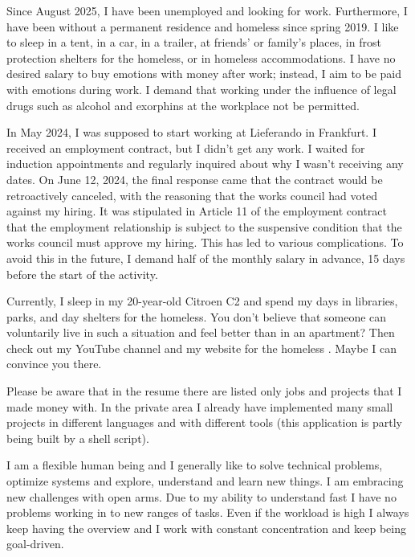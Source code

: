 \versionLanguageStart%
		Since August 2025, I have been unemployed and looking for work.
		Furthermore, I have been without a permanent residence and homeless since spring 2019.
		I like to sleep in a tent, in a car, in a trailer, at friends' or family's places, in frost protection shelters for the homeless, or in homeless accommodations.
		I have no desired salary to buy emotions with money after work; instead, I aim to be paid with emotions during work.
		I demand that working under the influence of legal drugs such as alcohol and exorphins at the workplace not be permitted.

		In May 2024, I was supposed to start working at Lieferando in Frankfurt.
		I received an employment contract, but I didn't get any work.
		I waited for induction appointments and regularly inquired about why I wasn't receiving any dates.
		On June 12, 2024, the final response came that the contract would be retroactively canceled, with the reasoning that the works council had voted against my hiring.
		It was stipulated in Article 11 of the employment contract that the employment relationship is subject to the suspensive condition that the works council must approve my hiring.
		This has led to various complications.
		To avoid this in the future, I demand half of the monthly salary in advance, 15 days before the start of the activity.

        Currently, I sleep in my 20-year-old Citroen C2 and spend my days in libraries, parks, and day shelters for the homeless.
		You don't believe that someone can voluntarily live in such a situation and feel better than in an apartment?
		Then check out my YouTube channel  and my website for the homeless .
		Maybe I can convince you there.

        Please be aware that in the resume there are listed only jobs and projects that I made money with.
		In the private area I already have implemented many small projects in different languages and with different tools (this application is partly being built by a shell script).

        I am a flexible human being and I generally like to solve technical problems, optimize systems and explore, understand and learn new things.
		I am embracing new challenges with open arms.
		Due to my ability to understand fast I have no problems working in to new ranges of tasks.
		Even if the workload is high I always keep having the overview and I work with constant concentration and keep being goal-driven.

